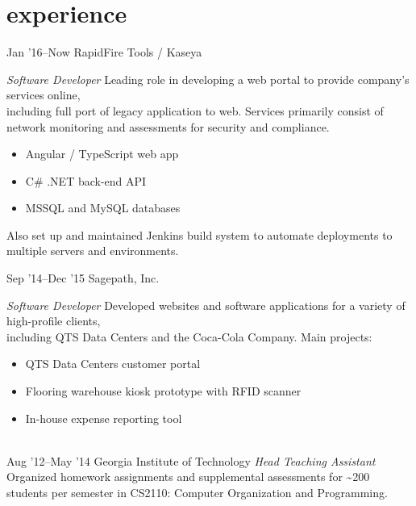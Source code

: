 \documentclass[print]{friggeri-cv} %
\begin{document}

\section{experience}

\begin{entrylist}
\entry
{Jan '16--Now}
{RapidFire Tools / Kaseya}
{}
{\emph{Software Developer}
\smallbreak
Leading role in developing a web portal to provide company's services online, \\
including full port of legacy application to web. Services primarily consist of \\
network monitoring and assessments for security and compliance.
\smallbreak
\begin{itemize}
\item Angular / TypeScript web app
\item C\# .NET back-end API
\item MSSQL and MySQL databases
\end{itemize}
\smallbreak
Also set up and maintained Jenkins build system to automate deployments to \\
multiple servers and environments.
\smallbreak }
\entry
{Sep '14--Dec '15}
{Sagepath, Inc.}
{}
{\emph{Software Developer}
\smallbreak
Developed websites and software applications for a variety of high-profile clients, \\including QTS Data Centers and the Coca-Cola Company.
\smallbreak
Main projects:
\begin{itemize}
\item QTS Data Centers customer portal
\item Flooring warehouse kiosk prototype with RFID scanner
\item In-house expense reporting tool
\end{itemize}}
\\
\entry
{Aug '12--May '14}
{Georgia Institute of Technology}
{}
{\emph{Head Teaching Assistant}
\smallbreak
Organized homework assignments and supplemental assessments for \textasciitilde200 students per semester in CS2110: Computer Organization and Programming. }
\end{entrylist}
\end{document}
